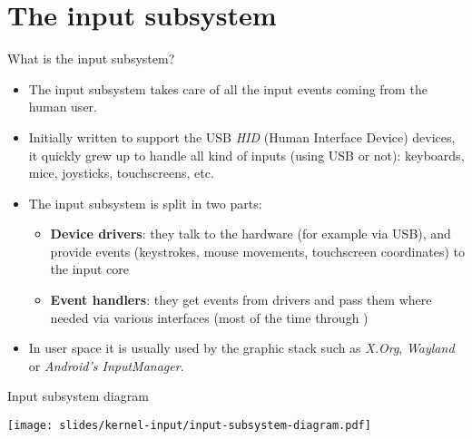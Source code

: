 \section{The input subsystem}

\begin{frame}{What is the input subsystem?}
  \begin{itemize}
  \item The input subsystem takes care of all the input events coming
    from the human user.
  \item Initially written to support the USB {\em HID} (Human
    Interface Device) devices, it quickly grew up to handle all kind
    of inputs (using USB or not): keyboards, mice, joysticks,
    touchscreens, etc.
  \item The input subsystem is split in two parts:
    \begin{itemize}
    \item {\bf Device drivers}: they talk to the hardware (for example
      via USB), and provide events (keystrokes, mouse movements,
      touchscreen coordinates) to the input core
    \item {\bf Event handlers}: they get events from drivers and pass
      them where needed via various interfaces (most of the time
      through )
    \end{itemize}
  \item In user space it is usually used by the graphic stack such
    as {\em X.Org}, {\em Wayland} or {\em Android's InputManager}.
  \end{itemize}
\end{frame}

\begin{frame}{Input subsystem diagram}
  \begin{center}
    \texttt{[image: slides/kernel-input/input-subsystem-diagram.pdf]}
  \end{center}
\end{frame}

